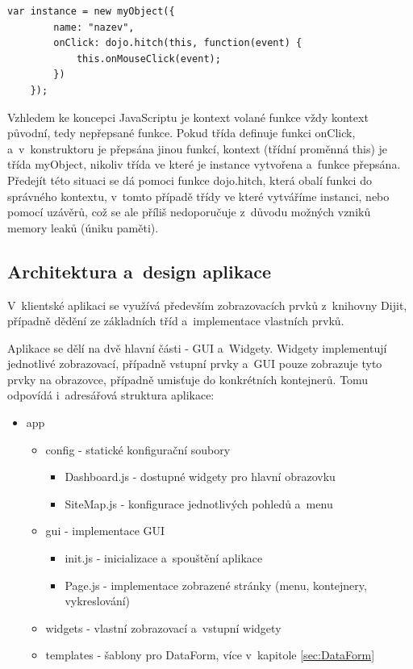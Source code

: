 \documentclass[bc,male,html,dept460]{diploma}				%
\begin{document}
\bigskip
\begin{lstlisting}[label=src:JavaScript,caption=Třídy v~DoJo toolkit]
	var instance = new myObject({
		name: "nazev",
		onClick: dojo.hitch(this, function(event) {
			this.onMouseClick(event);
		})
	});
\end{lstlisting}

Vzhledem ke koncepci JavaScriptu je kontext volané funkce vždy kontext původní, tedy nepřepsané funkce. Pokud třída  definuje funkci onClick, a~v~konstruktoru je přepsána jinou funkcí, kontext (třídní proměnná this) je třída myObject, nikoliv třída ve které je instance vytvořena a~funkce přepsána. Předejít této situaci se dá pomoci funkce dojo.hitch, která obalí funkci do správného kontextu, v~tomto případě třídy ve které vytváříme instanci, nebo pomocí uzávěrů, což se ale příliš nedoporučuje z~důvodu možných vzniků memory leaků (úniku paměti).



\subsection{Architektura a~design aplikace}
V~klientské aplikaci se využívá především zobrazovacích prvků z~knihovny Dijit, případně dědění ze základních tříd a~implementace vlastních prvků.

Aplikace se dělí na dvě hlavní části - GUI a~Widgety. Widgety implementují jednotlivé zobrazovací, případně vstupní prvky a~GUI pouze zobrazuje tyto prvky na obrazovce, případně umisťuje do konkrétních kontejnerů. Tomu odpovídá i~adresářová struktura aplikace:

\begin{itemize}
 \item app
    \begin{itemize}
     \item config - statické konfigurační soubory
        \begin{itemize}
	    \item Dashboard.js - dostupné widgety pro hlavní obrazovku
	    \item SiteMap.js - konfigurace jednotlivých pohledů a~menu
	\end{itemize}
     \item gui - implementace GUI
	\begin{itemize}
	 \item init.js - inicializace a~spouštění aplikace
	 \item Page.js - implementace zobrazené stránky (menu, kontejnery, vykreslování)
	\end{itemize}
     \item widgets - vlastní zobrazovací a~vstupní widgety
     \item templates - šablony pro DataForm, více v~kapitole \ref{sec:DataForm}
     
    \end{itemize}

\end{itemize}
\end{document}
